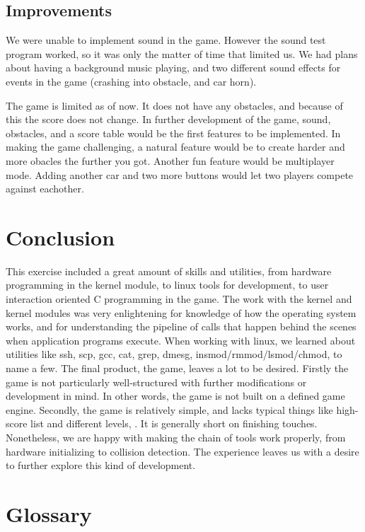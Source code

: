 \documentclass[12pt,a4paper,final]{report}
\numberwithin{equation}{section}
\numberwithin{table}{section}
\numberwithin{figure}{section}
\begin{document}
\subsection{Improvements}
\label{sec:improvements}
We were unable to implement sound in the game. However the sound test program worked, so it was only the matter of time that limited us. We had plans about having a background music playing, and two different sound effects for events in the game (crashing into obstacle, and car horn).

The game is limited as of now. It does not have any obstacles, and because of this the score does not change. In further development of the game, sound, obstacles, and a score table would be the first features to be implemented. In making the game challenging, a natural feature would be to create harder and more obacles the further you got. Another fun feature would be multiplayer mode. Adding another car and two more buttons would let two players compete against eachother.

\newpage

\section{Conclusion}
\label{sec:conclusion}

This exercise included a great amount of skills and utilities, from hardware programming in the kernel module, to linux tools for development, to user interaction oriented C programming in the game. The work with the kernel and kernel modules was very enlightening for knowledge of how the operating system works, and for understanding the pipeline of calls that happen behind the scenes when application programs execute. When working with linux, we learned about utilities like ssh, scp, gcc, cat, grep, dmesg, insmod/rmmod/lsmod/chmod, to name a few. The final product, the game, leaves a lot to be desired. Firstly the game is not particularly well-structured with further modifications or development in mind. In other words, the game is not built on a defined game engine. Secondly, the game is relatively simple, and lacks typical things like high-score list and different levels, . It is generally short on finishing touches. Nonetheless, we are happy with making the chain of tools work properly, from hardware initializing to collision detection. The experience leaves us with a desire to further explore this kind of development.

\section{Glossary}
\label{sec:glossary}
\end{document}
